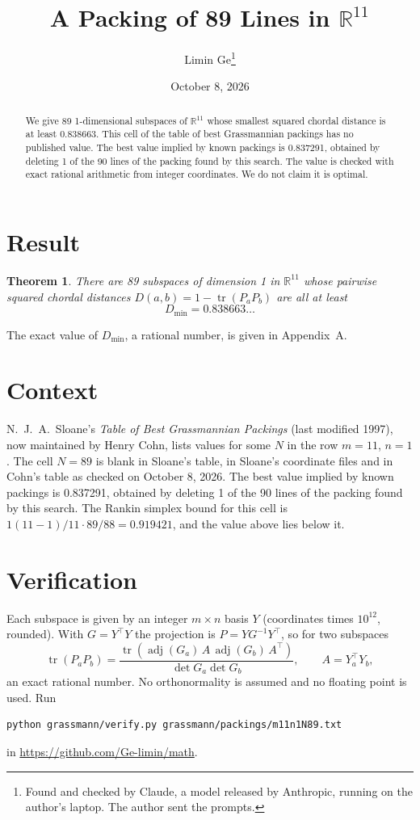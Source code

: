 \documentclass[11pt,a4paper]{article}
\title{A Packing of 89 Lines in $\mathbb{R}^{11}$}
\author{Limin Ge\thanks{Found and checked by Claude, a model released by Anthropic, running on the author's laptop. The author sent the prompts.}}
\date{October 8, 2026}
\newtheorem*{theorem}{Theorem}
\begin{document}
\maketitle
\begin{abstract}
We give 89 1-dimensional subspaces of $\mathbb{R}^{11}$ whose smallest squared chordal distance is at least 0.838663. This cell of the table of best Grassmannian packings has no published value. The best value implied by known packings is 0.837291, obtained by deleting 1 of the 90 lines of the packing found by this search. The value is checked with exact rational arithmetic from integer coordinates. We do not claim it is optimal.
\end{abstract}

\section{Result}
\begin{theorem}
There are 89 subspaces of dimension 1 in $\mathbb{R}^{11}$ whose pairwise squared chordal distances $D(a,b) = 1 - \operatorname{tr}(P_aP_b)$ are all at least
\[ D_{\min} = 0.838663\ldots \]
\end{theorem}
The exact value of $D_{\min}$, a rational number, is given in Appendix~A.


\section{Context}
N.~J.~A.~Sloane's \emph{Table of Best Grassmannian Packings} (last modified 1997), now maintained by Henry Cohn, lists values for some $N$ in the row $m=11$, $n=1$. The cell $N=89$ is blank in Sloane's table, in Sloane's coordinate files and in Cohn's table as checked on October 8, 2026. The best value implied by known packings is 0.837291, obtained by deleting 1 of the 90 lines of the packing found by this search. The Rankin simplex bound for this cell is $1(11-1)/11\cdot 89/88 = 0.919421$, and the value above lies below it.


\section{Verification}
Each subspace is given by an integer $m\times n$ basis $Y$ (coordinates times $10^{12}$, rounded). With $G=Y^\top Y$ the projection is $P=YG^{-1}Y^\top$, so for two subspaces
\[ \operatorname{tr}(P_aP_b)=\frac{\operatorname{tr}(\operatorname{adj}(G_a)\,A\,\operatorname{adj}(G_b)\,A^\top)}{\det G_a\det G_b},\qquad A=Y_a^\top Y_b, \]
an exact rational number. No orthonormality is assumed and no floating point is used. Run
\begin{verbatim}
python grassmann/verify.py grassmann/packings/m11n1N89.txt
\end{verbatim}
in \url{https://github.com/Ge-limin/math}.
\end{document}
